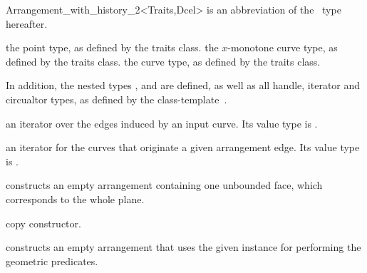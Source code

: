 \begin{ccRefClass}{Arrangement_with_history_2<Traits,Dcel>}
 is an abbreviation of the \ccRefName\ type hereafter.


\ccTypes

\ccGlue
{}

  {the point type, as defined by the traits class.}
\ccGlue
{}
  {the $x$-monotone curve type, as defined by the traits class.}
\ccGlue
{}
  {the curve type, as defined by the traits class.}

In addition, the nested types ,  and 
are defined, as well as all handle, iterator and circualtor types, as
defined by the 
class-template~.

\ccGlue
{}

       {an iterator over the edges induced by an input curve.
        Its value type is .}

    {an iterator for the curves that originate a given arrangement edge.
     Its value type is .}

\ccCreation
{}
    
    {constructs an empty arrangement containing one unbounded face,
     which corresponds to the
     whole plane.}
    
    {copy constructor.}
        
    {constructs an empty arrangement that uses the given 
     instance for performing the geometric predicates.}




\end{ccRefClass}
